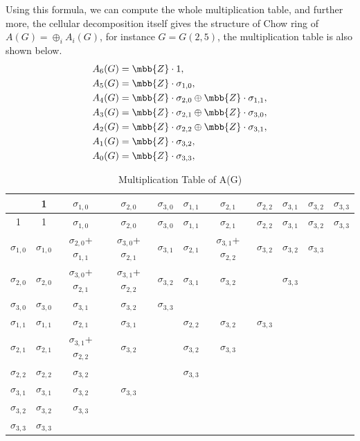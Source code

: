 \documentclass[a4paper, twoside]{article}
\begin{document}
Using this formula, we can compute the whole multiplication table, and further more, the cellular decomposition itself gives the structure of Chow ring of $A(G)=\oplus_i A_i(G)$, for instance $G=G(2,5)$, the multiplication table is also shown below.
\begin{align*}
	A_6(G)&=\mbb{Z}\cdot 1,\\
	A_5(G)&=\mbb{Z}\cdot\sigma_{1,0},\\
	A_4(G)&=\mbb{Z}\cdot\sigma_{2,0}\oplus\mbb{Z}\cdot\sigma_{1,1},\\
	A_3(G)&=\mbb{Z}\cdot\sigma_{2,1}\oplus\mbb{Z}\cdot\sigma_{3,0},\\
	A_2(G)&=\mbb{Z}\cdot\sigma_{2,2}\oplus\mbb{Z}\cdot\sigma_{3,1},\\
	A_1(G)&=\mbb{Z}\cdot\sigma_{3,2},\\
	A_0(G)&=\mbb{Z}\cdot\sigma_{3,3},\\
\end{align*}
\begin{table}[H]
	\centering
	\caption{Multiplication Table of A(G)}
	\label{tab:multi}
    \begin{tabular}{c|cccccccccc}
    	\toprule
      	 & 1 & $\sigma_{1,0}$ & $\sigma_{2,0}$ & $\sigma_{3,0}$ & $\sigma_{1,1}$ & $\sigma_{2,1}$ & $\sigma_{2,2}$ & $\sigma_{3,1}$ & $\sigma_{3,2}$ & $\sigma_{3,3}$ \\
     	\midrule
     	1 & 1&$\sigma_{1,0}$ & $\sigma_{2,0}$ & $\sigma_{3,0}$ & $\sigma_{1,1}$ & $\sigma_{2,1}$ & $\sigma_{2,2}$ & $\sigma_{3,1}$ & $\sigma_{3,2}$ & $\sigma_{3,3}$ \\
     	$\sigma_{1,0}$ &$\sigma_{1,0}$&$\sigma_{2,0}$+$\sigma_{1,1}$&$\sigma_{3,0}$+$\sigma_{2,1}$ &$\sigma_{3,1}$&$\sigma_{2,1}$&$\sigma_{3,1}$+$\sigma_{2,2}$&$\sigma_{3,2}$&$\sigma_{3,2}$&$\sigma_{3,3}$\\
     	$\sigma_{2,0}$ &$\sigma_{2,0}$&$\sigma_{3,0}$+$\sigma_{2,1}$&$\sigma_{3,1}$+$\sigma_{2,2}$&$\sigma_{3,2}$&$\sigma_{3,1}$&$\sigma_{3,2}$&&$\sigma_{3,3}$\\
     	$\sigma_{3,0}$ &$\sigma_{3,0}$&$\sigma_{3,1}$&$\sigma_{3,2}$&$\sigma_{3,3}$\\
     	$\sigma_{1,1}$ &$\sigma_{1,1}$&$\sigma_{2,1}$&$\sigma_{3,1}$&&$\sigma_{2,2}$&$\sigma_{3,2}$&$\sigma_{3,3}$\\
     	$\sigma_{2,1}$ &$\sigma_{2,1}$&$\sigma_{3,1}$+$\sigma_{2,2}$&$\sigma_{3,2}$&&$\sigma_{3,2}$&$\sigma_{3,3}$\\
     	$\sigma_{2,2}$ &$\sigma_{2,2}$&$\sigma_{3,2}$&&&$\sigma_{3,3}$\\
     	$\sigma_{3,1}$ &$\sigma_{3,1}$&$\sigma_{3,2}$&$\sigma_{3,3}$\\
     	$\sigma_{3,2}$ &$\sigma_{3,2}$&$\sigma_{3,3}$\\
     	$\sigma_{3,3}$ &$\sigma_{3,3}$\\
     	\bottomrule
     \end{tabular}
\end{table}
\end{document}
